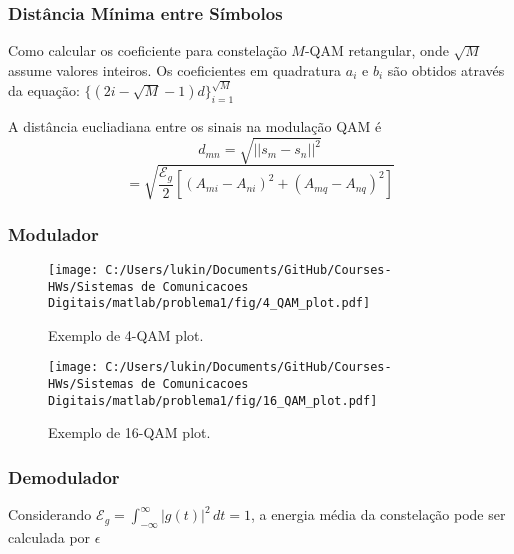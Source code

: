 \subsubsection{Distância Mínima entre Símbolos}

Como calcular os coeficiente para constelação $M$-QAM retangular, onde $\sqrt{M}$ assume valores inteiros. Os coeficientes em quadratura $a_i$ e $b_i$ são obtidos através da equação: $\{ (2i -\sqrt{M} - 1)d \}_{i=1}^{\sqrt{M}} $ 

A distância eucliadiana entre os sinais na modulação QAM é
$$ d_{mn} = \sqrt{|| s_m - s_n||^2}$$ 
$$ = \sqrt{\frac{\mathcal{E}_g}{2}[(A_{mi} - A_{ni})^2 + (A_{mq} - A_{nq})^2]}$$

\subsubsection{Modulador}

\begin{figure}[!ht]
    \centering
    \texttt{[image: C:/Users/lukin/Documents/GitHub/Courses-HWs/Sistemas de Comunicacoes Digitais/matlab/problema1/fig/4\_QAM\_plot.pdf]}
    \caption{Exemplo de 4-QAM plot.}
    \label{fig:4_QAM_plot}
\end{figure}

\begin{figure}[!ht]
    \centering
    \texttt{[image: C:/Users/lukin/Documents/GitHub/Courses-HWs/Sistemas de Comunicacoes Digitais/matlab/problema1/fig/16\_QAM\_plot.pdf]}
    \caption{Exemplo de 16-QAM plot.}
    \label{fig:16_QAM_plot}
\end{figure}



\subsubsection{Demodulador}

Considerando $\mathcal{E}_g = \int_{-\infty}^{\infty} |g(t)|^2 \,dt = 1$, a energia média da constelação pode ser calculada por $\epsilon$



